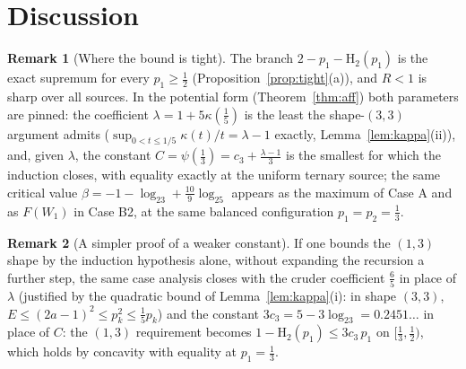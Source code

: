 \documentclass[journal]{IEEEtran}
\theoremstyle{definition}
\newtheorem{remark}{Remark}
\newcommand{\Hh}{\mathrm H_2}
\newcommand{\kp}{\kappa}
\newcommand{\lgg}{\log_2}
\newcommand{\CC}{C}
\newcommand{\lam}{\lambda}
\newcommand{\cthree}{c_3}
\begin{document}
\section{Discussion}\label{sec:disc}

\begin{remark}[Where the bound is tight]\label{rem:where}
The branch $2-p_1-\Hh(p_1)$ is the exact supremum for every $p_1\ge\tfrac12$
(Proposition~\ref{prop:tight}(a)), and $R<1$ is sharp over all sources. In the
potential form (Theorem~\ref{thm:aff}) both parameters are pinned: the
coefficient $\lam=1+5\kp(\tfrac15)$ is the least the shape-$(3,3)$ argument
admits ($\sup_{0<t\le1/5}\kp(t)/t=\lam-1$ exactly,
Lemma~\ref{lem:kappa}(ii)), and, given $\lam$, the constant
$\CC=\psi(\tfrac13)=\cthree+\tfrac{\lam-1}3$ is the smallest for
which the induction closes, with equality exactly at the uniform ternary
source; the same critical value $\beta=-1-\lgg3+\tfrac{10}9\lgg5$ appears as
the maximum of Case A and as $F(W_1)$ in Case B2, at the same balanced
configuration $p_1=p_2=\tfrac13$.
\end{remark}

\begin{remark}[A simpler proof of a weaker constant]\label{rem:simple}
If one bounds the $(1,3)$ shape by the induction hypothesis alone, without
expanding the recursion a further step, the same case analysis closes with the cruder coefficient
$\tfrac65$ in place of $\lam$ (justified by the quadratic bound of
Lemma~\ref{lem:kappa}(i): in shape $(3,3)$,
$E\le(2a-1)^2\le p_k^2\le\tfrac15p_k$) and the constant
$3\cthree=5-3\lgg3=0.2451\ldots$ in place of $\CC$: the $(1,3)$ requirement
becomes $1-\Hh(p_1)\le3\cthree\,p_1$ on $[\tfrac13,\tfrac12)$, which holds by
concavity with equality at $p_1=\tfrac13$.
\end{remark}
\end{document}
